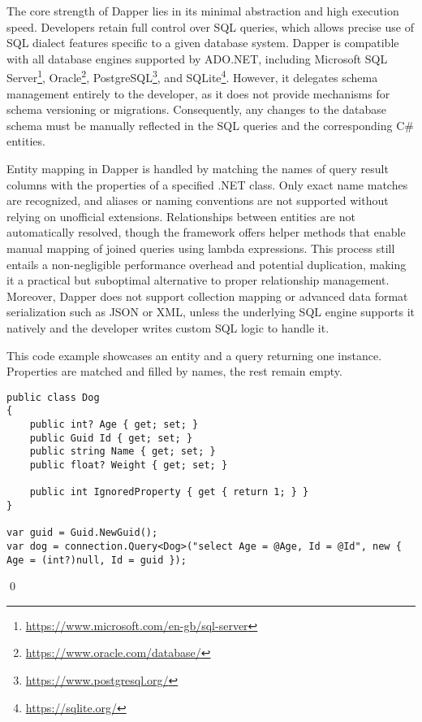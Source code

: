 The core strength of Dapper lies in its minimal abstraction and high execution speed. Developers retain full control over SQL queries, which allows precise use of SQL dialect features specific to a given database system. Dapper is compatible with all database engines supported by ADO.NET, including Microsoft SQL Server\footnote{\url{https://www.microsoft.com/en-gb/sql-server}}, Oracle\footnote{\url{https://www.oracle.com/database/}}, PostgreSQL\footnote{\url{https://www.postgresql.org/}}, and SQLite\footnote{\url{https://sqlite.org/}}. However, it delegates schema management entirely to the developer, as it does not provide mechanisms for schema versioning or migrations. Consequently, any changes to the database schema must be manually reflected in the SQL queries and the corresponding C\# entities.

Entity mapping in Dapper is handled by matching the names of query result columns with the properties of a specified .NET class. Only exact name matches are recognized, and aliases or naming conventions are not supported without relying on unofficial extensions. Relationships between entities are not automatically resolved, though the framework offers helper methods that enable manual mapping of joined queries using lambda expressions. This process still entails a non-negligible performance overhead and potential duplication, making it a practical but suboptimal alternative to proper relationship management. Moreover, Dapper does not support collection mapping or advanced data format serialization such as JSON or XML, unless the underlying SQL engine supports it natively and the developer writes custom SQL logic to handle it.

\begin{example}
\small
This code example\cite{DapperRepo} showcases an entity and a query returning one instance. Properties are matched and filled by names, the rest remain empty.

\begin{lstlisting}[language=CSharp]
public class Dog
{
    public int? Age { get; set; }
    public Guid Id { get; set; }
    public string Name { get; set; }
    public float? Weight { get; set; }

    public int IgnoredProperty { get { return 1; } }
}

var guid = Guid.NewGuid();
var dog = connection.Query<Dog>("select Age = @Age, Id = @Id", new { Age = (int?)null, Id = guid });
\end{lstlisting}
\qed
\end{example}

